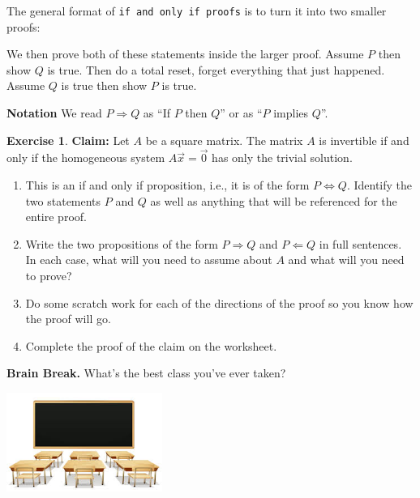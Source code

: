 \documentclass[handout]{beamer}
\newcommand{\vecx}{\vec{x}}
\newcommand{\zerovector}{\vec{0}}
\newcommand{\fn}{\insertframenumber}
\theoremstyle{definition}
\newtheorem{exercise}{Exercise}
\renewcommand{\emph}[1]{{\color{blue}\texttt{#1}}}
\begin{document}
\begin{frame}[fragile]
\frametitle{\fn}
The general format of \emph{if and only if proofs} is to turn it into two smaller proofs:
\begin{center}
\end{center}
We then prove both of these statements inside the larger proof.  Assume $P$ then show $Q$ is true.  Then do a total reset, forget everything that just happened.  Assume $Q$ is true then show $P$ is true.

\begin{block}{\textbf{Notation}}
	We read $P\Rightarrow Q$ as ``If $P$ then $Q$'' or as ``$P$ implies $Q$''.
\end{block}
\end{frame}
\begin{frame}{\fn}
\begin{exercise}\label{triv_sol}
	\textbf{Claim:} Let $A$ be a square matrix. The matrix $A$ is invertible if and only if the homogeneous system $A\vecx=\zerovector$ has only the trivial solution.
	
	\begin{enumerate}[label=(\alph*)]
		\item This is an if and only if proposition, i.e., it is of the form $P\Leftrightarrow Q$.  Identify the two statements $P$ and $Q$ as well as anything that will be referenced for the entire proof.
		\item Write the two propositions of the form $P\Rightarrow Q$ and $P\Leftarrow Q$ in full sentences.  In each case, what will you need to assume about $A$ and what will you need to prove?
		\item Do some scratch work for each of the directions of the proof so you know how the proof will go.
		\item Complete the proof of the claim on the worksheet.
	\end{enumerate}
\end{exercise}
\end{frame}

\begin{frame}{\fn}
	\begin{block}{\textbf{Brain Break.}}
		What’s the best class you’ve ever taken?
		\begin{center}
			\includegraphics[width=2in]{images/class}
		\end{center}
	\end{block}
\end{frame}
\end{document}
